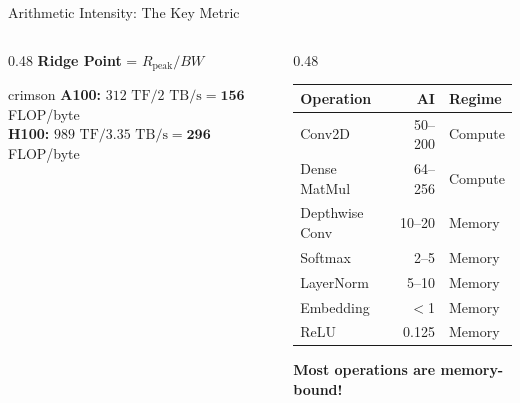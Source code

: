 \documentclass[aspectratio=169, 12pt]{beamer}
\begin{document}
\begin{frame}{Arithmetic Intensity: The Key Metric}
\begin{columns}[T]
\begin{column}{0.48\textwidth}
    \vspace{0.05cm}
    \textbf{Ridge Point} = $R_{\text{peak}} / BW$

    \vspace{0.05cm}
    \begin{mlsyscard}{crimson}
    {\scriptsize \textbf{A100:} $312\text{ TF}/2\text{ TB/s}=\textbf{156}$ FLOP/byte\\
    \textbf{H100:} $989\text{ TF}/3.35\text{ TB/s}=\textbf{296}$ FLOP/byte}
    \end{mlsyscard}
  \end{column}
  \begin{column}{0.48\textwidth}
    \renewcommand{\arraystretch}{1.05}
    {\scriptsize
    \begin{tabular}{@{}lrl@{}}
      \toprule
      \textbf{Operation} & \textbf{AI} & \textbf{Regime} \\
      \midrule
      Conv2D        & 50--200 & Compute \\
      Dense MatMul  & 64--256 & Compute \\
      Depthwise Conv & 10--20 & Memory \\
      Softmax       & 2--5   & Memory \\
      LayerNorm     & 5--10  & Memory \\
      Embedding     & $<$1   & Memory \\
      ReLU          & 0.125  & Memory \\
      \bottomrule
    \end{tabular}
    }

    \vspace{0.05cm}
    {\footnotesize\textcolor{errorstroke}{\textbf{Most operations are memory-bound!}}}
  \end{column}
\end{columns}

\end{frame}
\end{document}
